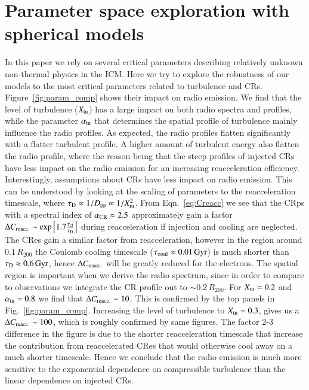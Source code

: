 \documentclass[fleqn,usenatbib,useAMS]{mnras}
\begin{document}
\section{Parameter space exploration with spherical models}
\label{sect:param_comp}
In this paper we rely on several critical parameters describing
relatively unknown non-thermal physics in the ICM. Here we try to
explore the robustness of our models to the most critical parameters
related to turbulence and CRs. Figure~\ref{fig:param_comp} shows their
impact on radio emission. We find that the level of turbulence
($X_{\mathrm{tu}}$) has a large impact on both radio spectra and profiles,
while the parameter $\alpha_{\mathrm{tu}}$ that determines the spatial
profile of turbulence mainly influence the radio profiles. As
expected, the radio profiles flatten significantly with a flatter
turbulent profile. A higher amount of turbulent energy also flatten
the radio profile, where the reason being that the steep profiles of
injected CRs have less impact on the radio emission for an increasing
reacceleration efficiency. Interestingly, assumptions about CRs have
less impact on radio emission. This can be understood by looking at
the scaling of parameters to the reacceleration timescale, where
$\tau_{\mathrm{D}} \propto 1/D_{\mathrm{pp}} \propto 1/X_{\mathrm{tu}}^2$. From
Eqn.~\ref{eq:Creacc} we see that the CRps with a spectral index of
$\alpha_{\mathrm{CR}}\approx2.5$ approximately gain a factor $\Delta
C_{\mathrm{reacc.}} \sim
\exp{\left[1.7\frac{\tau_{\mathrm{cl}}}{\tau_{\mathrm{D}}}\right]}$ during
reacceleration if injection and cooling are neglected. The CRes gain a
similar factor from reacceleration, however in the region around
$0.1\,R_{200}$ the Coulomb cooling timescale
($\tau_{\mathrm{coul}}\approx0.01\,{\mathrm{Gyr}}$) is much shorter than
$\tau_{\mathrm{D}}\approx0.6\,{\mathrm{Gyr}}$, hence $\Delta C_{\mathrm{reacc.}}$
will be greatly reduced for the electrons. The spatial region is
important when we derive the radio spectrum, since in order to compare
to observations we integrate the CR profile out to $\sim
0.2\,R_{200}$. For $X_{\mathrm{tu}}=0.2$ and $\alpha_{\mathrm{tu}}=0.8$ we find
that $\Delta C_{\mathrm{reacc.}} \sim 10$. This is confirmed by the top
panels in Fig.~\ref{fig:param_comp}. Increasing the level of
turbulence to $X_{\mathrm{tu}}=0.3$, gives us a $\Delta C_{\mathrm{reacc.}}
\sim 100$, which is roughly confirmed by same figures. The factor 2-3
difference in the figure is due to the shorter reacceleration
timescale that increase the contribution from reaccelerated CRes that
would otherwise cool away on a much shorter timescale. Hence we
conclude that the radio emission is much more sensitive to the
exponential dependence on compressible turbulence than the linear
dependence on injected CRs.
\end{document}

